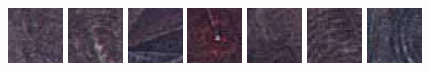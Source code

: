 \documentclass[a4paper,11pt]{article}
\begin{document}
\begin{figure}[h!]
\includegraphics[width=0.13\textwidth]{img/regiones/C3_50x50_01.png}
\includegraphics[width=0.13\textwidth]{img/regiones/C3_50x50_02.png}
\includegraphics[width=0.13\textwidth]{img/regiones/C3_50x50_03.png}
\includegraphics[width=0.13\textwidth]{img/regiones/C3_50x50_04.png}
\includegraphics[width=0.13\textwidth]{img/regiones/C3_50x50_05.png}
\includegraphics[width=0.13\textwidth]{img/regiones/C3_50x50_06.png}
\includegraphics[width=0.13\textwidth]{img/regiones/C3_50x50_07.png}
\vspace{0.5cm}


\end{figure}
\end{document}
